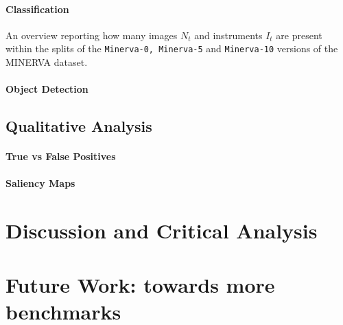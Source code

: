 \paragraph{Classification}


\begin{table}
    
\caption{An overview reporting how many images $N_t$ and instruments $I_t$ are present within the splits of the \texttt{Minerva-0, Minerva-5} and \texttt{Minerva-10} versions of the MINERVA dataset.}
\label{table:minerva_splits}
\end{table}

\paragraph{Object Detection}



\begin{figure}[htb!]
	\scalebox{0.8}{}
	\caption{}
	\label{fig:detection_experiment_1}
\end{figure}


\begin{figure}[htb!]
	\scalebox{0.8}{}
	\caption{}
	\label{fig:detection_experiment_2}
\end{figure}



\begin{figure}[htb!]
	\scalebox{0.8}{}
	\caption{}
	\label{fig:detection_experiment_3}
\end{figure}


\begin{figure}[htb!]
	\scalebox{0.8}{}
	\caption{}
	\label{fig:detection_experiment_4}
\end{figure}




\subsection{Qualitative Analysis}
\paragraph{True vs False Positives}
\paragraph{Saliency Maps}


\section{Discussion and Critical Analysis}
\label{sec:discussion}


\section{Future Work: towards more benchmarks}
\label{sec:future_work}
